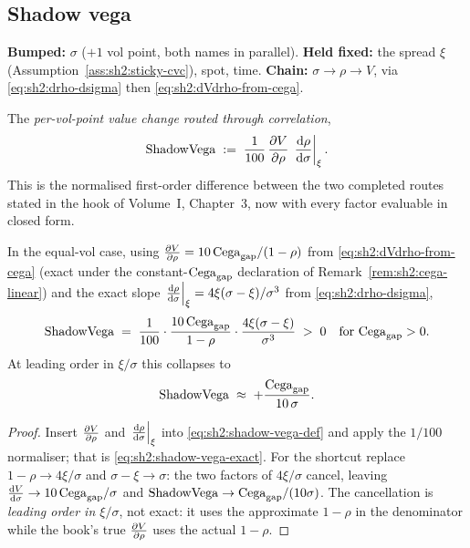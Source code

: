 \subsection{Shadow vega}\label{sec:sh2:shadow-vega}

\textbf{Bumped:} $\sigma$ ($+1$ vol point, both names in parallel).
\textbf{Held fixed:} the spread $\xi$
(Assumption~\ref{ass:sh2:sticky-cvc}), spot, time.
\textbf{Chain:} $\sigma \to \rho \to V$, via
\eqref{eq:sh2:drho-dsigma} then \eqref{eq:sh2:dVdrho-from-cega}.

\begin{definition}\label{def:sh2:shadow-vega}
The \emph{per-vol-point value change routed through correlation},
\begin{equation}\label{eq:sh2:shadow-vega-def}
  \mathrm{ShadowVega} \;:=\; \frac{1}{100}\, \frac{\partial V}{\partial \rho}\,
                 \left.\frac{\mathrm{d} \rho}{\mathrm{d} \sigma}\right|_{\xi}.
\end{equation}
This is the normalised first-order difference between the two completed
routes stated in the hook of Volume~I, Chapter~3, now with every factor
evaluable in closed form.
\end{definition}

\begin{proposition}\label{prop:sh2:shadow-vega}
In the equal-vol case, using
$\frac{\partial V}{\partial \rho} = 10\,\mathrm{Cega}_{\mathrm{gap}}/(1 - \rho)$ from
\eqref{eq:sh2:dVdrho-from-cega} (exact under the constant-$\mathrm{Cega}_{\mathrm{gap}}$
declaration of Remark~\ref{rem:sh2:cega-linear}) and the exact slope
$\left.\frac{\mathrm{d} \rho}{\mathrm{d} \sigma}\right|_{\xi} = 4\xi(\sigma - \xi)/\sigma^3$ from
\eqref{eq:sh2:drho-dsigma},
\begin{equation}\label{eq:sh2:shadow-vega-exact}
  \mathrm{ShadowVega}
  \;=\; \frac{1}{100} \cdot \frac{10\,\mathrm{Cega}_{\mathrm{gap}}}{1 - \rho}
        \cdot \frac{4\xi(\sigma - \xi)}{\sigma^3}
  \;>\; 0 \quad \text{for } \mathrm{Cega}_{\mathrm{gap}} > 0.
\end{equation}
At leading order in $\xi/\sigma$ this collapses to
\begin{equation}\label{eq:sh2:shadow-vega-shortcut}
  \mathrm{ShadowVega} \;\approx\; +\frac{\mathrm{Cega}_{\mathrm{gap}}}{10\,\sigma}.
\end{equation}
\end{proposition}

\begin{proof}
Insert $\frac{\partial V}{\partial \rho}$ and $\left.\frac{\mathrm{d} \rho}{\mathrm{d} \sigma}\right|_{\xi}$ into
\eqref{eq:sh2:shadow-vega-def} and apply the $1/100$ normaliser; that is
\eqref{eq:sh2:shadow-vega-exact}. For the shortcut replace
$1 - \rho \to 4\xi/\sigma$ and $\sigma - \xi \to \sigma$: the two factors
of $4\xi/\sigma$ cancel, leaving
$\frac{\mathrm{d} V}{\mathrm{d} \sigma} \to 10\,\mathrm{Cega}_{\mathrm{gap}}/\sigma$ and
$\mathrm{ShadowVega} \to \mathrm{Cega}_{\mathrm{gap}}/(10\sigma)$. The cancellation is \emph{leading order in
$\xi/\sigma$}, not exact: it uses the approximate $1 - \rho$ in the
denominator while the book's true $\frac{\partial V}{\partial \rho}$ uses the actual
$1 - \rho$.
\end{proof}


